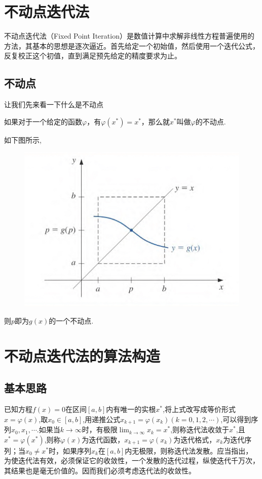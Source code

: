 \section{不动点迭代法}
不动点迭代法（Fixed Point Iteration）是数值计算中求解非线性方程普遍使用的方法，其基本的思想是逐次逼近。首先给定一个初始值，然后使用一个迭代公式，反复校正这个初值，直到满足预先给定的精度要求为止。
\subsection{不动点}
让我们先来看一下什么是不动点
\begin{thm}
  如果对于一个给定的函数$\varphi$，有$\varphi(x^*)=x^*$，那么就$x^*$叫做$\varphi$的不动点.
\end{thm}
如下图所示,\\
\begin{figure}[h]
  \centering
  \includegraphics[scale=0.6]{fig1}
  \label{fig:fig1}
\end{figure}

则$p$即为$g(x)$的一个不动点.
\section{不动点迭代法的算法构造}
\subsection{基本思路}
已知方程$f(x)=0$在区间$[a,b]$内有唯一的实根$x^*$,将上式改写成等价形式$x=\varphi(x)$,取$x_0\in[a,b]$,用递推公式$x_{k+1}=\varphi(x_k)(k=0,1,2,\cdots)$,可以得到序列$x_0,x_1,\cdots$.如果当$k\rightarrow\infty$时，有极限$ \lim_{k\to\infty}x_k=x^*$,则称迭代法收敛于$x^*$,且$x^*=\varphi(x^*)$,则称$\varphi(x)为迭代函数$，$x_{k+1}=\varphi(x_k)$为迭代格式，${x_k}$为迭代序列；当$x_0\neq x^*$时，如果序列${x_k}$在$[a,b]$内无极限，则称迭代法发散。应当指出，为使迭代法有效，必须保证它的收敛性，一个发散的迭代过程，纵使迭代千万次，其结果也是毫无价值的。因而我们必须考虑迭代法的收敛性。
